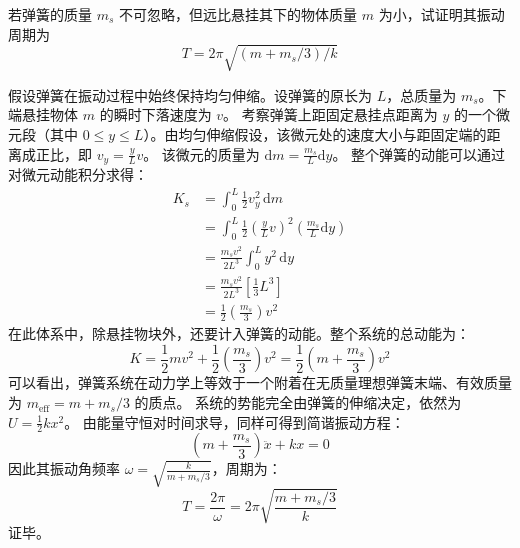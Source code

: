\begin{exercise}\label{ex:7.5}
若弹簧的质量 $m_s$ 不可忽略，但远比悬挂其下的物体质量 $m$ 为小，试证明其振动周期为
$$T = 2\pi\sqrt{(m + m_s/3)/k}$$
\end{exercise}
\begin{solution}
假设弹簧在振动过程中始终保持均匀伸缩。设弹簧的原长为 $L$，总质量为 $m_s$。下端悬挂物体 $m$ 的瞬时下落速度为 $v$。
考察弹簧上距固定悬挂点距离为 $y$ 的一个微元段（其中 $0 \le y \le L$）。由均匀伸缩假设，该微元处的速度大小与距固定端的距离成正比，即 $v_y = \frac{y}{L} v$。
该微元的质量为 $\mathrm{d}m = \frac{m_s}{L} \mathrm{d}y$。
整个弹簧的动能可以通过对微元动能积分求得：
\begin{align*}
    K_s &= \int_0^L \frac{1}{2} v_y^2 \, \mathrm{d}m \\
        &= \int_0^L \frac{1}{2} \left( \frac{y}{L} v \right)^2 \left( \frac{m_s}{L} \mathrm{d}y \right) \\
        &= \frac{m_s v^2}{2 L^3} \int_0^L y^2 \, \mathrm{d}y \\
        &= \frac{m_s v^2}{2 L^3} \left[ \frac{1}{3} L^3 \right] \\
        &= \frac{1}{2} \left( \frac{m_s}{3} \right) v^2
\end{align*}
在此体系中，除悬挂物块外，还要计入弹簧的动能。整个系统的总动能为：
$$ K = \frac{1}{2} m v^2 + \frac{1}{2} \left( \frac{m_s}{3} \right) v^2 = \frac{1}{2} \left( m + \frac{m_s}{3} \right) v^2 $$
可以看出，弹簧系统在动力学上等效于一个附着在无质量理想弹簧末端、有效质量为 $m_{\text{eff}} = m + m_s/3$ 的质点。
系统的势能完全由弹簧的伸缩决定，依然为 $U = \frac{1}{2} k x^2$。
由能量守恒对时间求导，同样可得到简谐振动方程：
$$ \left( m + \frac{m_s}{3} \right) \ddot{x} + k x = 0 $$
因此其振动角频率 $\omega = \sqrt{\frac{k}{m + m_s/3}}$，周期为：
$$ T = \frac{2\pi}{\omega} = 2\pi \sqrt{\frac{m + m_s/3}{k}} $$
证毕。
\end{solution}


